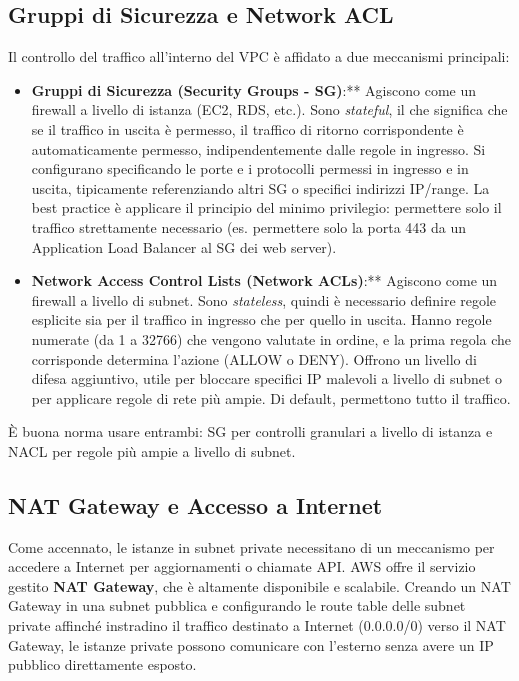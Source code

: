 \subsection{Gruppi di Sicurezza e Network ACL}
\label{subsec:sg-nacl}
Il controllo del traffico all'interno del VPC è affidato a due meccanismi principali:
\begin{itemize}
    \item \textbf{Gruppi di Sicurezza (Security Groups - SG)}:** Agiscono come un firewall a livello di istanza (EC2, RDS, etc.). Sono \textit{stateful}, il che significa che se il traffico in uscita è permesso, il traffico di ritorno corrispondente è automaticamente permesso, indipendentemente dalle regole in ingresso. Si configurano specificando le porte e i protocolli permessi in ingresso e in uscita, tipicamente referenziando altri SG o specifici indirizzi IP/range. La best practice è applicare il principio del minimo privilegio: permettere solo il traffico strettamente necessario (es. permettere solo la porta 443 da un Application Load Balancer al SG dei web server).
    \item \textbf{Network Access Control Lists (Network ACLs)}:** Agiscono come un firewall a livello di subnet. Sono \textit{stateless}, quindi è necessario definire regole esplicite sia per il traffico in ingresso che per quello in uscita. Hanno regole numerate (da 1 a 32766) che vengono valutate in ordine, e la prima regola che corrisponde determina l'azione (ALLOW o DENY). Offrono un livello di difesa aggiuntivo, utile per bloccare specifici IP malevoli a livello di subnet o per applicare regole di rete più ampie. Di default, permettono tutto il traffico.
\end{itemize}
È buona norma usare entrambi: SG per controlli granulari a livello di istanza e NACL per regole più ampie a livello di subnet.

\subsection{NAT Gateway e Accesso a Internet}
\label{subsec:nat-gateway}
Come accennato, le istanze in subnet private necessitano di un meccanismo per accedere a Internet per aggiornamenti o chiamate API. AWS offre il servizio gestito \textbf{NAT Gateway}, che è altamente disponibile e scalabile. Creando un NAT Gateway in una subnet pubblica e configurando le route table delle subnet private affinché instradino il traffico destinato a Internet (0.0.0.0/0) verso il NAT Gateway, le istanze private possono comunicare con l'esterno senza avere un IP pubblico direttamente esposto.

